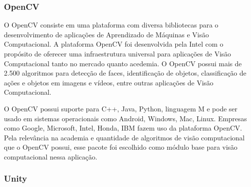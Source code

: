     \subsubsection{OpenCV}	
    
        O OpenCV consiste em uma plataforma com diversa bibliotecas para o desenvolvimento de aplicações de Aprendizado de Máquinas e Visão Computacional. A plataforma OpenCV foi desenvolvida pela Intel com o propósito de oferecer uma infraestrutura universal para aplicações de Visão Computacional tanto no mercado quanto acedemia. O OpenCV possui mais de 2.500 algoritmos para detecção de faces, identificação de objetos, classificação de ações e objetos em imagens e vídeos, entre outras aplicações de Visão Computacional.	

        O OpenCV possui suporte para C++, Java, Python, linguagem M e pode ser usado em sistemas operacionais como Android, Windows, Mac, Linux. Empresas como Google, Microsoft, Intel, Honda,  IBM fazem uso da plataforma OpenCV. Pela relevância na academia e quantidade de algoritmos de visão computacional que o OpenCV possui, esse pacote foi escolhido como módulo base para visão computacional nessa aplicação.	

    



    \subsubsection{Unity}	

